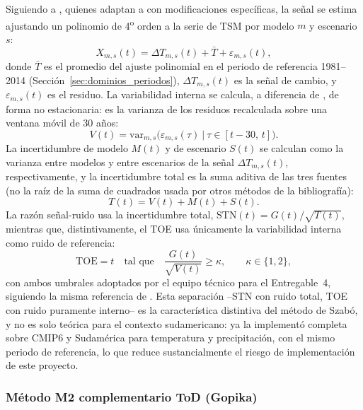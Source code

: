 \documentclass[11pt,a4paper]{article}
\begin{document}
Siguiendo a \citet{szabo2016}, quienes adaptan a \citet{hawkins2012} con modificaciones espec\'ificas, la se\~nal se estima ajustando un polinomio de 4\textsuperscript{o} orden a la serie de TSM por modelo $m$ y escenario $s$:
\begin{equation}
\label{eq:szabo_signal}
X_{m,s}(t) = \Delta T_{m,s}(t) + \bar{T} + \varepsilon_{m,s}(t),
\end{equation}
donde $\bar{T}$ es el promedio del ajuste polinomial en el periodo de referencia 1981--2014 (Secci\'on~\ref{sec:dominios_periodos}), $\Delta T_{m,s}(t)$ es la se\~nal de cambio, y $\varepsilon_{m,s}(t)$ es el residuo. La variabilidad interna se calcula, a diferencia de \citet{hawkins2012}, de forma no estacionaria: es la varianza de los residuos recalculada sobre una ventana m\'ovil de 30 a\~nos:
\begin{equation}
\label{eq:szabo_V}
V(t) = \mathrm{var}_{m,s}\big(\varepsilon_{m,s}(\tau)\ \big|\ \tau \in [t-30,\,t]\big).
\end{equation}
La incertidumbre de modelo $M(t)$ y de escenario $S(t)$ se calculan como la varianza entre modelos y entre escenarios de la se\~nal $\Delta T_{m,s}(t)$, respectivamente, y la incertidumbre total es la suma aditiva de las tres fuentes (no la ra\'iz de la suma de cuadrados usada por otros m\'etodos de la bibliograf\'ia):
\begin{equation}
\label{eq:szabo_T}
T(t) = V(t) + M(t) + S(t).
\end{equation}
La raz\'on se\~nal-ruido usa la incertidumbre total, $\mathrm{STN}(t) = G(t)/\sqrt{T(t)}$, mientras que, distintivamente, el TOE usa \'unicamente la variabilidad interna como ruido de referencia:
\begin{equation}
\label{eq:szabo_toe}
\mathrm{TOE} = t \quad \text{tal que} \quad \frac{G(t)}{\sqrt{V(t)}} \geq \kappa, \qquad \kappa \in \{1, 2\},
\end{equation}
con ambos umbrales adoptados por el equipo t\'ecnico para el Entregable~4, siguiendo la misma referencia de \citet{szabo2016}. Esta separaci\'on --STN con ruido total, TOE con ruido puramente interno-- es la caracter\'istica distintiva del m\'etodo de Szab\'o, y no es solo te\'orica para el contexto sudamericano: \citet{bruno2023} ya la implement\'o completa sobre CMIP6 y Sudam\'erica para temperatura y precipitaci\'on, con el mismo periodo de referencia, lo que reduce sustancialmente el riesgo de implementaci\'on de este proyecto.

\subsubsection{M\'etodo M2 complementario ToD (Gopika)}
\end{document}
